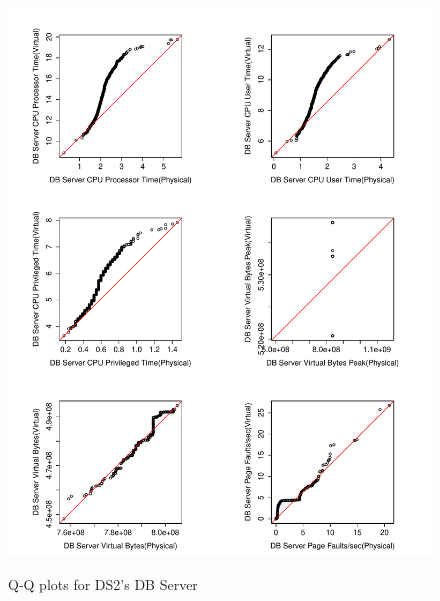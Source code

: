 \begin{figure}[tbh]
	\centering
	{\includegraphics[width=1.0\textwidth]{figures/appendix/qq_plots/DS2/DB_Server/First_six.pdf}}
	\caption{Q-Q plots for DS2's DB Server}
\end{figure}


